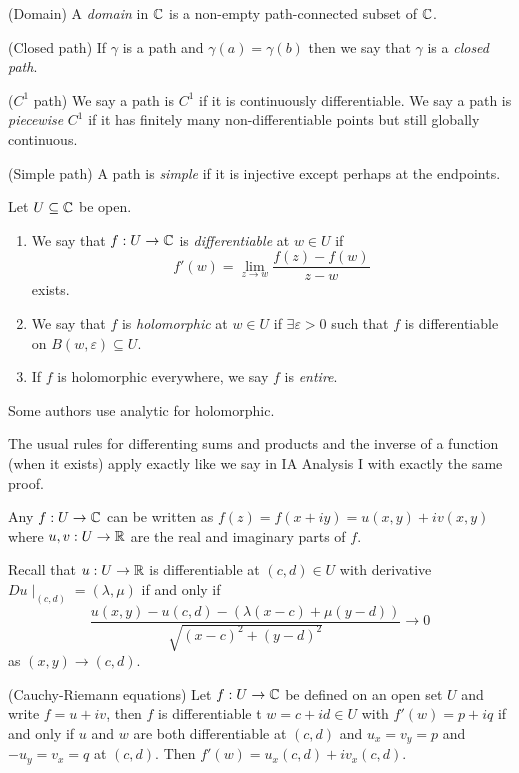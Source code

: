 \documentclass{article}
\begin{document}
\begin{definition}
	(Domain) A \textit{domain} in $ \mathbb{C} $ is a non-empty path-connected subset of $ \mathbb{C} $.
\end{definition}
\begin{definition}
	(Closed path) If $ \gamma $ is a path and $ \gamma(a)=\gamma(b) $ then we say that $ \gamma $ is a \textit{closed path}.
\end{definition}
\begin{definition}
	($ C^1 $ path) We say a path is $ C^1 $ if it is continuously differentiable. We say a path is \textit{piecewise} $ C^1 $ if it has finitely many non-differentiable points but still globally continuous.
\end{definition}
\begin{definition}
	(Simple path) A path is \textit{simple} if it is injective except perhaps at the endpoints.
\end{definition}
\begin{definition}
  Let $ U\subseteq \mathbb{C} $ be open.
  \begin{enumerate}
	  \item We say that $ f:U\to \mathbb{C} $ is \textit{differentiable} at $ w\in U $ if
		  \[
			  f'(w)=\lim_{z\to w}\frac{f(z)-f(w)}{z-w}
		  \]
		  exists.
	  \item We say that $ f $ is \textit{holomorphic} at $ w\in U $ if $ \exists \varepsilon>0 $ such that $ f $ is differentiable on $ B(w,\varepsilon)\subseteq U $.
	  \item If $ f $ is holomorphic everywhere, we say $ f $ is \textit{entire}.
  \end{enumerate}
\end{definition}
\begin{remark}
  Some authors use analytic for holomorphic.
\end{remark}
\begin{remark}
  The usual rules for differenting sums and products and the inverse of a function (when it exists) apply exactly like we say in IA Analysis I with exactly the same proof.
\end{remark}
Any $ f:U\to \mathbb{C} $ can be written as $ f(z)=f(x+iy) = u(x,y)+iv(x,y) $ where $ u,v:U\to \mathbb{R} $ are the real and imaginary parts of $ f $.\par
Recall that $ u:U\to \mathbb{R} $ is differentiable at $ (c,d)\in U $ with derivative $ Du\mid_{(c,d)}= (\lambda,\mu) $ if and only if
\[
	\frac{u(x,y)-u(c,d) - (\lambda(x-c) + \mu(y-d))}{\sqrt{(x-c)^2+(y-d)^2}}\to 0
\]
as $ (x,y)\to (c,d) $.
\begin{proposition}
	(Cauchy-Riemann equations) Let $ f:U\to \mathbb{C} $ be defined on an open set $ U $ and write $ f=u+iv $, then $ f $ is differentiable t $ w= c+id\in U $ with $ f'(w)=p+iq $ if and only if $ u $ and $ w $ are both differentiable at $ (c,d) $ and $ u_x=v_y = p $ and $ -u_y = v_x=q $ at $ (c,d) $. Then $ f'(w) = u_x(c,d)+iv_x(c,d) $. 
\end{proposition}
\end{document}
